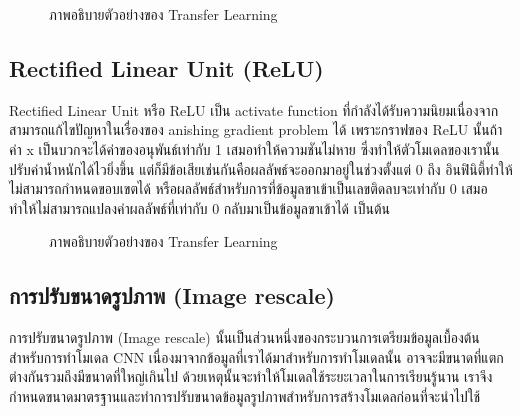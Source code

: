 \documentclass[12pt,oneside,openright,a4paper]{cpe-thai-project}
\begin{document}
\begin{figure}[!ht]\centering
  \setlength{\fboxrule}{0.2mm} %
  \setlength{\fboxsep}{1cm}
  \caption{ภาพอธิบายตัวอย่างของ Transfer Learning}\label{fig:sigmoid}
\end{figure}

\subsection{Rectified Linear Unit (ReLU)}
Rectified Linear Unit หรือ ReLU เป็น activate function ที่กำลังได้รับความนิยมเนื่องจากสามารถแก้ไขปัญหาในเรื่องของ 
anishing gradient problem ได้ เพราะกราฟของ ReLU นั้นถ้าค่า x เป็นบวกจะได้ค่าของอนุพันธ์เท่ากับ 1 เสมอทำให้ความชันไม่หาย 
ซึ่งทำให้ตัวโมเดลของเรานั้นปรับค่าน้ำหนักได้ไวยิ่งขึ้น แต่ก็มีข้อเสียเช่นกันคือผลลัพธ์จะออกมาอยู่ในช่วงตั้งแต่ 0 ถึง อินฟินิตี้ทำให้ไม่สามารถกำหนดขอบเขตได้ หรือผลลัพธ์สำหรับการที่ข้อมูลขาเข้าเป็นเลขติดลบจะเท่ากับ 
0 เสมอทำให้ไม่สามารถแปลงค่าผลลัพธ์ที่เท่ากับ 0 กลับมาเป็นข้อมูลขาเข้าได้ เป็นต้น 


\begin{figure}[!ht]\centering
  \setlength{\fboxrule}{0.2mm} %
  \setlength{\fboxsep}{1cm}
  \caption{ภาพอธิบายตัวอย่างของ Transfer Learning}\label{fig:relu}
\end{figure}



\subsection{การปรับขนาดรูปภาพ (Image rescale)}
การปรับขนาดรูปภาพ (Image rescale) นั้นเป็นส่วนหนึ่งของกระบวนการเตรียมข้อมูลเบื้องต้นสำหรับการทำโมเดล CNN 
เนื่องมาจากข้อมูลที่เราได้มาสำหรับการทำโมเดลนั้น อาจจะมีขนาดที่แตกต่างกันรวมถึงมีขนาดที่ใหญ่เกินไป ด้วยเหตุนั้นจะทำให้โมเดลใช้ระยะเวลาในการเรียนรู้นาน 
เราจึงกำหนดขนาดมาตรฐานและทำการปรับขนาดข้อมูลรูปภาพสำหรับการสร้างโมเดลก่อนที่จะนำไปใช้
\end{document}
